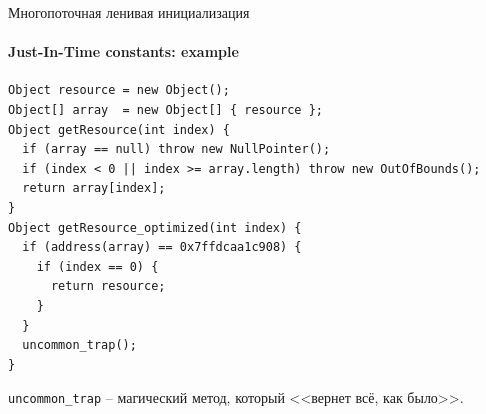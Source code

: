\begin{frame}{Многопоточная ленивая инициализация}
\framesubtitle{Just-In-Time constants: example}

\begin{verbatim}
Object resource = new Object();
Object[] array  = new Object[] { resource };
Object getResource(int index) {
  if (array == null) throw new NullPointer();
  if (index < 0 || index >= array.length) throw new OutOfBounds();
  return array[index];
}
Object getResource_optimized(int index) {
  if (address(array) == 0x7ffdcaa1c908) {
    if (index == 0) {
      return resource;
    }
  }
  uncommon_trap();
}
\end{verbatim}

\texttt{uncommon\_trap} -- магический метод, который <<вернет всё, как было>>.

\pause


\end{frame}

% 
% 
% 
% 
% 
% 


